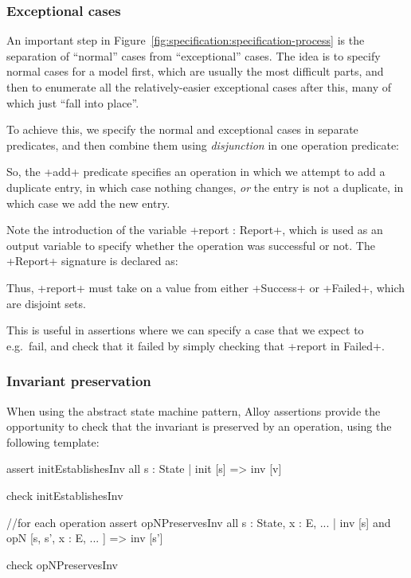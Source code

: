 \subsubsection{Exceptional cases}

An important step in Figure~\ref{fig:specification:specification-process} is the separation of ``normal'' cases from ``exceptional'' cases. The idea is to specify normal cases for a model first, which are usually the most difficult parts, and then to enumerate all the relatively-easier exceptional cases after this, many of which just ``fall into place''.

To achieve this, we specify the normal and exceptional cases in separate predicates, and then combine them using \emph{disjunction} in one operation predicate:


So, the \A+add+ predicate specifies an operation in which we attempt to add a duplicate entry, in which case nothing changes, \emph{or} the entry is not a duplicate, in which case we add the new entry.

Note the introduction of the variable \A+report : Report+, which is used as an output variable to specify whether the operation was successful or not. The \A+Report+ signature is declared as:


Thus, \A+report+ must take on a value from either \A+Success+ or \A+Failed+, which are disjoint sets.

This is useful in assertions where we can specify a case that we expect to e.g.\ fail, and check that it failed by simply checking that \A+report in Failed+.

\subsubsection{Invariant preservation}

When using the abstract state machine pattern, Alloy assertions provide the opportunity to check that the invariant is preserved by an operation, using the following template:

\begin{alloy}
assert initEstablishesInv {
  all s : State | init [s] => inv [v]
}

check initEstablishesInv

//for each operation
assert opNPreservesInv {
  all s : State, x : E, ... |
    inv [s] and opN [s, s', x : E, ... ] => inv [s']
}

check opNPreservesInv
\end{alloy}

